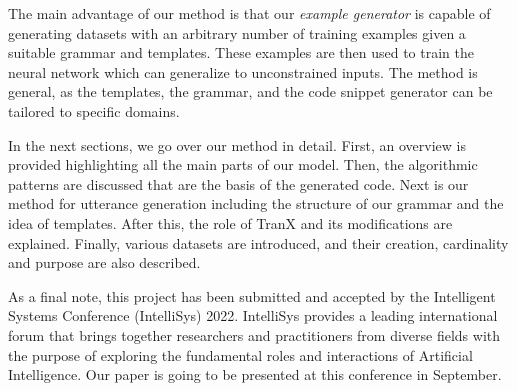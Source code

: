 The main advantage of our method is that our \emph{example generator} is capable
of generating datasets with an arbitrary number of training examples given a
suitable grammar and templates. These examples are then used to train the neural
network which can generalize to unconstrained inputs. The method is general, as
the templates, the grammar, and the code snippet generator can be tailored to
specific domains.

In the next sections, we go over our method in detail. First, an overview is
provided highlighting all the main parts of our model. Then, the algorithmic
patterns are discussed that are the basis of the generated code. Next is our
method for utterance generation including the structure of our grammar and the
idea of templates. After this, the role of TranX and its modifications are
explained. Finally, various datasets are introduced, and their creation,
cardinality and purpose are also described.

As a final note, this project has been submitted and accepted by the
Intelligent Systems Conference (IntelliSys) 2022. IntelliSys provides
a leading international forum that brings together researchers and
practitioners from diverse fields with the purpose of exploring the
fundamental roles and interactions of Artificial Intelligence. 
Our paper is going to be presented at this conference in September. 
